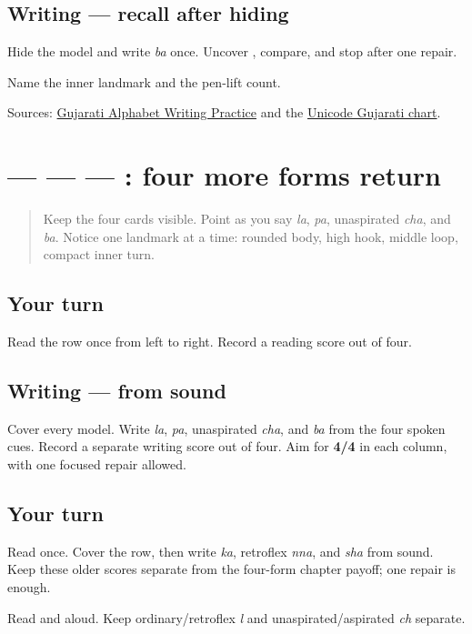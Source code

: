\subsection*{Writing — recall after hiding}
Hide the model and write \emph{ba} once. Uncover \textbf{}, compare, and stop after one repair.

\begin{tcolorbox}[breakable,colback=teal!4,colframe=teal!35!black,title={Before you move on}]
Name the inner landmark and the pen-lift count.

Sources: \href{https://www.t30apps.com/gujarati-alphabet-writing/}{Gujarati Alphabet Writing Practice} and the \href{https://www.unicode.org/charts/PDF/U0A80.pdf}{Unicode Gujarati chart}.
\end{tcolorbox}
\section[\texorpdfstring{\gu{લ} — \gu{પ} — \gu{ચ} — \gu{બ} (la — pa — cha — ba)}{લ — પ — ચ — બ (la — pa — cha — ba)}]{ —  —  — : four more forms return}

\label{lesson:GU-R05-second-four-r1}



\begin{quote}
Keep the four cards visible. Point as you say \emph{la}, \emph{pa}, unaspirated \emph{cha}, and \emph{ba}. Notice one landmark at a time: rounded body, high hook, middle loop, compact inner turn.
\end{quote}

\subsection*{Your turn}
Read the row once from left to right. Record a reading score out of four.

\subsection*{Writing — from sound}
Cover every model. Write \emph{la}, \emph{pa}, unaspirated \emph{cha}, and \emph{ba} from the four spoken cues. Record a separate writing score out of four. Aim for \textbf{4/4} in each column, with one focused repair allowed.

\subsection*{Your turn}
Read \textbf{  } once. Cover the row, then write \emph{ka}, retroflex \emph{nna}, and \emph{sha} from sound. Keep these older scores separate from the four-form chapter payoff; one repair is enough.

\begin{tcolorbox}[breakable,colback=teal!4,colframe=teal!35!black,title={Before you move on}]
Read \textbf{ } and \textbf{ } aloud. Keep ordinary/retroflex \emph{l} and unaspirated/aspirated \emph{ch} separate.
\end{tcolorbox}
